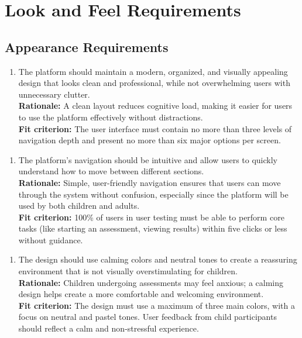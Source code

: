 \documentclass[12pt]{article}
\begin{document}
\section{Look and Feel Requirements}
\subsection{Appearance Requirements}
\begin{enumerate}[{LF-AR}1. ]
  \item The platform should maintain a modern, organized, and visually appealing design that looks clean and professional, while not 
  overwhelming users with unnecessary clutter.\\
  \textbf{Rationale: }A clean layout reduces cognitive load, making it easier for users to use the platform effectively without distractions.\\
  \textbf{Fit criterion: }The user interface must contain no more than three levels of navigation depth and present no more than six major options per screen.  
\end{enumerate}
\begin{enumerate}[{LF-AR}2. ]
  \item The platform’s navigation should be intuitive and allow users to quickly understand how to move between different sections.\\
  \textbf{Rationale: }Simple, user-friendly navigation ensures that users can move through the system without confusion, especially since the platform will be used by both children and adults.\\
  \textbf{Fit criterion: }100\% of users in user testing must be able to perform core tasks (like starting an assessment, viewing results) within five clicks or less without guidance.  
\end{enumerate}
\begin{enumerate}[{LF-AR}3. ]
  \item The design should use calming colors and neutral tones to create a reassuring environment that is not visually overstimulating for children.\\
  \textbf{Rationale: }Children undergoing assessments may feel anxious; a calming design helps create a more comfortable and welcoming environment.\\
  \textbf{Fit criterion: }The design must use a maximum of three main colors, with a focus on neutral and pastel tones. User feedback from child participants should reflect a calm and non-stressful experience.  
\end{enumerate}
\end{document}
